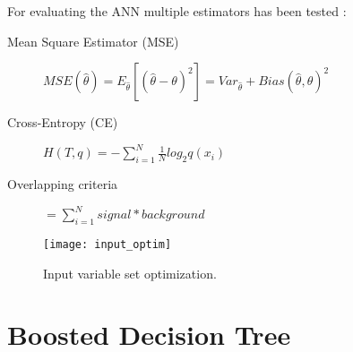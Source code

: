 For evaluating the ANN multiple estimators has been tested :
\begin{description}
	\item [Mean Square Estimator (MSE)] $ MSE(\hat{\theta}) = E_{\hat{\theta}} [(\hat{\theta} - \theta)^2] =
    Var_{\hat{\theta}} + Bias(\hat{\theta}, \theta)^2$
	\item [Cross-Entropy (CE)] $ H(T,q) = -\sum_{i=1}^{N}{\frac{1}{N} log_2 q(x_i)}$
	\item [Overlapping criteria] $ = \sum_{i=1}^{N}{signal*background}$
\end{description}

\begin{figure}[h!]
    \texttt{[image: input\_optim]}
    \caption{Input variable set optimization.}
    \label{input_optim}
\end{figure}


\section{Boosted Decision Tree}

